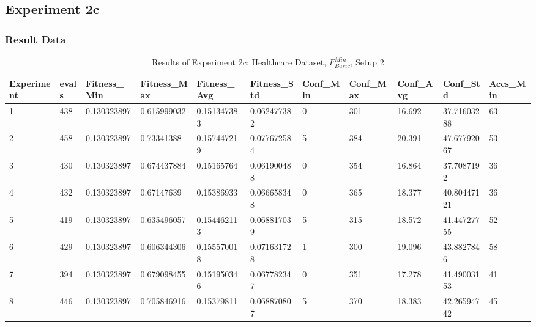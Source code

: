 	\subsection{Experiment 2c}
	\label{sec:A_Exp2c}
		\subsubsection{Result Data}
		\label{sec:A_Exp2c_Data}
			\begin{table}[H]
				\caption{Results of Experiment 2c: Healthcare Dataset, $F_{Basic}^{Min}$, Setup 2}
				\label{tab:A_Exp2c_Data}
				\begin{adjustbox}{max width=380pt,keepaspectratio,angle=90}
					\begin{tabular}{|l|l|l|l|l|l|l|l|l|l|l|}
						\rowcolor[HTML]{EFEFEF} 
						\hline
						Experiment & evals & Fitness\_Min & Fitness\_Max & Fitness\_Avg & Fitness\_Std & Conf\_Min & Conf\_Max & Conf\_Avg & Conf\_Std   & Accs\_Min \\ \hline
						1          & 438   & 0.130323897  & 0.615999032  & 0.151347383  & 0.062477382  & 0         & 301       & 16.692    & 37.71603288 & 63        \\ \hline
						2          & 458   & 0.130323897  & 0.73341388   & 0.157447219  & 0.077672584  & 5         & 384       & 20.391    & 47.67792067 & 53        \\ \hline
						3          & 430   & 0.130323897  & 0.674437884  & 0.15165764   & 0.061900488  & 0         & 354       & 16.864    & 37.7087192  & 36        \\ \hline
						4          & 432   & 0.130323897  & 0.67147639   & 0.15386933   & 0.066658348  & 0         & 365       & 18.377    & 40.80447121 & 36        \\ \hline
						5          & 419   & 0.130323897  & 0.635496057  & 0.154462113  & 0.068817039  & 5         & 315       & 18.572    & 41.44727755 & 52        \\ \hline
						6          & 429   & 0.130323897  & 0.606344306  & 0.155570018  & 0.071631728  & 1         & 300       & 19.096    & 43.8827846  & 58        \\ \hline
						7          & 394   & 0.130323897  & 0.679098455  & 0.151950346  & 0.067782347  & 0         & 351       & 17.278    & 41.49003153 & 41        \\ \hline
						8          & 446   & 0.130323897  & 0.705846916  & 0.15379811   & 0.068870807  & 5         & 370       & 18.383    & 42.26594742 & 45        \\ \hline

\end{tabular}
\end{adjustbox}
\end{table}
